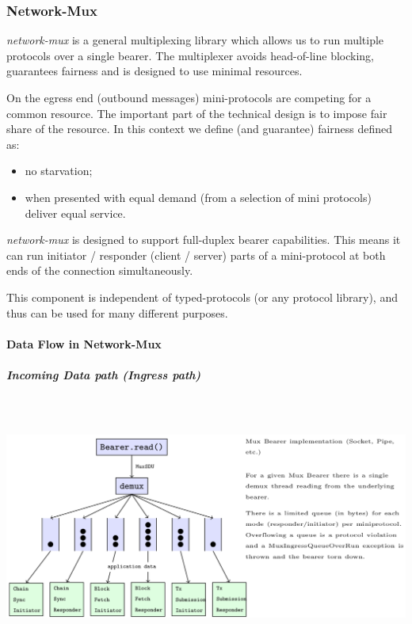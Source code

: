 \documentclass[11pt,a4paper]{article}
\begin{document}
\subsubsection{Network-Mux}
\label{network-mux}

\emph{network-mux} is a general multiplexing library which allows us to
run multiple protocols over a single bearer. The multiplexer avoids
head-of-line blocking, guarantees fairness and is designed to use
minimal resources.

On the egress end (outbound messages) mini-protocols are competing for a
common resource. The important part of the technical design is to impose
fair share of the resource. In this context we define (and guarantee)
fairness defined as:

\begin{itemize}
\item
  no starvation;
\item
  when presented with equal demand (from a selection of mini protocols)
  deliver equal service.
\end{itemize}

\emph{network-mux} is designed to support full-duplex bearer
capabilities. This means it can run initiator / responder (client /
server) parts of a mini-protocol at both ends of the connection
simultaneously.

This component is independent of typed-protocols (or any protocol
library), and thus can be used for many different purposes.

\paragraph{Data Flow in Network-Mux}

\subparagraph{Incoming Data path (Ingress path)}

~\\
\includegraphics[width=6.27083in,height=2.875in]{./media/image2.png}
\end{document}
